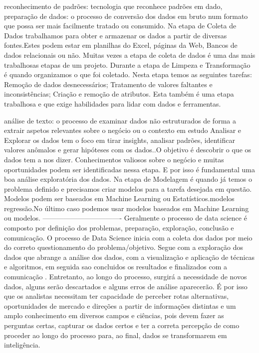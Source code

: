 reconhecimento de padrões: tecnologia que reconhece padrões em dado, 
 preparação de dados: o processo de conversão dos dados em bruto num formato que possa ser mais facilmente tratado ou consumido. Na etapa de Coleta de Dados trabalhamos para obter e armazenar os dados a partir de diversas fontes.Estes podem estar em planilhas do Excel, páginas da Web, Bancos de dados relacionais ou não. Muitas vezes a etapa de coleta de dados é uma das mais trabalhosas etapas de um projeto. Durante a etapa de Limpeza e Transformação é quando organizamos o que foi coletado. Nesta etapa temos as seguintes tarefas: Remoção de dados desnecessários; Tratamento de valores faltantes e inconsistências; Criação e remoção de atributos. Esta também é uma etapa trabalhosa e que exige habilidades para lidar com dados e ferramentas.

análise de texto: o processo de examinar dados não estruturados de forma a extrair aspetos relevantes sobre o negócio ou o contexto em estudo
Analisar e Explorar os dados tem o foco em tirar insights, analisar padrões, identificar valores anômalos e gerar hipóteses com os dados..O objetivo é descobrir o que os dados tem a nos dizer. Conhecimentos valiosos sobre o negócio e muitas oportunidades podem ser identificadas nessa etapa. E por isso é fundamental uma boa análise exploratória dos dados.
Na etapa de Modelagem é quando já temos o problema definido e precisamos criar modelos para a tarefa desejada em questão. Modelos podem ser baseados em Machine Learning ou Estatísticos.modelos regressão.No último caso podemos usar modelos baseados em Machine Learning ou modelos.
----------------------------------
Geralmente o processo de data science é composto por definição dos problemas, preparação, exploração, conclusão e comunicação. 
O processo de Data Science  inicia com a coleta dos dados por meio do correto questionamento do problema/objetivo. Segue com a exploração dos dados que abrange a análise dos dados, com a visualização e aplicação de técnicas e algoritmos, em seguida sao concluidos os resultados e finalizados  com a comunicação .  Entretanto, ao longo do processo, surgirá a necessidade de novos dados, alguns serão descartados e alguns erros de análise aparecerão. É por isso que os analistas  necessitam ter  capacidade de perceber rotas alternativas, oportunidades de mercado e direções a partir de informações distintas e um amplo conhecimento em diversos campos e ciências, pois devem fazer as perguntas certas, capturar os dados certos e ter a correta percepção de como proceder ao longo do processo para, ao final, dados se transformarem em inteligência.


